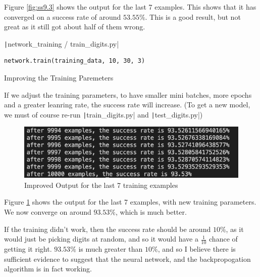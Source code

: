 \documentclass[12pt]{report}
\newcommand{\pil}[1]{\protect\texttt|#1|}
\begin{document}
Figure \ref{fig:ss9.3} shows the output for the last 7 examples. This shows that it has converged on a success rate of around $53.55\%$. This is a good result, but not great as it still got about half of them wrong.

\begin{listing}[H]
\pil{network_training / train_digits.py}
\begin{verbatim}
network.train(training_data, 10, 30, 3)
\end{verbatim}
\caption{Improving the Training Paremeters}\label{cs:improveTrainingParameters}
\end{listing}

If we adjust the training parameters, to have smaller mini batches, more epochs and a greater leanring rate, the success rate will increase. (To get a new model, we must of course re-run \pil{train_digits.py} and \pil{test_digits.py})

\begin{figure}[H]
\centering
\includegraphics[width=14cm]{ss9.4.png}
\caption{Improved Output for the last 7 training examples}\label{fig:ss9.4}
\end{figure}

Figure \ref{fig:ss9.4} shows the output for the last 7 examples, with new training parameters. We now converge on around $93.53\%$, which is much better.

If the training didn't work, then the success rate should be around $10\%$, as it would just be picking digits at random, and so it would have a $\frac{1}{10}$ chance of getting it right. $93.53\%$ is much greater than $10\%$, and so I believe there is sufficient evidence to suggest that the neural network, and the backpropogation algorithm is in fact working.

\begin{center}
\end{center}
\end{document}
